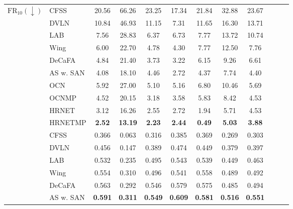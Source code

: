 \documentclass[journal,transmag]{IEEEtran}
\begin{document}
\begin{table}[t]
\begin{center}
{\begin{tabular}{|c|l|c|c|c|c|c|c|c|c|c|c|}
\multirow{12}{*}{$\text{FR}_{10}(\downarrow)$} 
   & CFSS \cite{zhu2015face}             & 20.56 & 66.26 & 23.25 & 17.34 & 21.84 & 32.88 & 23.67 \\
~ & DVLN \cite{wu2017leveraging}        & 10.84 & 46.93 & 11.15 & 7.31  & 11.65 & 16.30 & 13.71 \\
~ & LAB \cite{LABWFLW}                  & 7.56  & 28.83 & 6.37  & 6.73  & 7.77  & 13.72 & 10.74 \\
~ & Wing \cite{feng2018wing}            & 6.00  & 22.70 & 4.78  & 4.30  & 7.77  & 12.50 & 7.76  \\
~ & DeCaFA \cite{dapogny2019decafa}     & 4.84  & 21.40 & 3.73  & 3.22  & 6.15  & 9.26  & 6.61  \\
~ & AS w. SAN \cite{qian2019aggregation}& 4.08  & 18.10 & 4.46  & 2.72  & 4.37  & 7.74  & 4.40  \\
\cline{2-9}\cline{2-9}
~& OCN & 5.92 & 27.00 & 5.10 & 5.16 & 6.80 & 10.46 & 5.69 \\
~& OCNMP & 4.52 & 20.15 & 3.18 & 3.58 & 5.83 & 8.42 & 4.53 \\
~& HRNET &  3.12 & 16.26 & 2.55 & 2.72 & 1.94 & 5.71 &  4.53 \\
~& HRNETMP & {\bf 2.52} & {\bf 13.19} & {\bf 2.23} & {\bf 2.44} & {\bf 0.49} & {\bf 5.03} &  {\bf 3.88} \\
\hline

\multirow{12}{*}{$\text{AUC}_{10}(\uparrow)$} 
   & CFSS \cite{zhu2015face}             & 0.366 & 0.063 & 0.316 & 0.385 & 0.369 & 0.269 & 0.303 \\
~ & DVLN \cite{wu2017leveraging}        & 0.456 & 0.147 & 0.389 & 0.474 & 0.449 & 0.379 & 0.397 \\
~ & LAB \cite{LABWFLW}                  & 0.532 & 0.235 & 0.495 & 0.543 & 0.539 & 0.449 & 0.463 \\
~ & Wing \cite{feng2018wing}            & 0.554 & 0.310 & 0.496 & 0.541 & 0.558 & 0.489 & 0.492 \\
~ & DeCaFA \cite{dapogny2019decafa}     & 0.563 & 0.292 & 0.546 & 0.579 & 0.575 & 0.485 & 0.494  \\
~ & AS w. SAN \cite{qian2019aggregation}& {\bf 0.591} & {\bf 0.311} & {\bf 0.549} & {\bf 0.609} & {\bf 0.581} & {\bf 0.516} & {\bf 0.551} \\


\end{tabular}}
\end{center}
\end{table}
\end{document}
